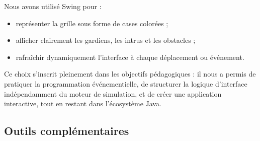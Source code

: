 Nous avons utilisé Swing pour :
\begin{itemize}
    \item représenter la grille sous forme de cases colorées ;
    \item afficher clairement les gardiens, les intrus et les obstacles ;
    \item rafraîchir dynamiquement l’interface à chaque déplacement ou événement.
\end{itemize}

Ce choix s’inscrit pleinement dans les objectifs pédagogiques : il nous a permis de pratiquer la programmation événementielle, de structurer la logique d’interface indépendamment du moteur de simulation, et de créer une application interactive, tout en restant dans l’écosystème Java.

\subsection{Outils complémentaires}

